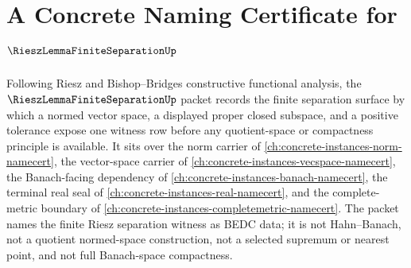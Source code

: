 \chapter{A Concrete Naming Certificate for $\RieszLemmaFiniteSeparationUp$}
\label{ch:concrete-instances-riesz-lemma-finite-separation-namecert}

Following Riesz and Bishop--Bridges constructive functional analysis, the $\RieszLemmaFiniteSeparationUp$ packet records the finite separation surface by which a normed vector space, a displayed proper closed subspace, and a positive tolerance expose one witness row before any quotient-space or compactness principle is available. It sits over the norm carrier of \autoref{ch:concrete-instances-norm-namecert}, the vector-space carrier of \autoref{ch:concrete-instances-vecspace-namecert}, the Banach-facing dependency of \autoref{ch:concrete-instances-banach-namecert}, the terminal real seal of \autoref{ch:concrete-instances-real-namecert}, and the complete-metric boundary of \autoref{ch:concrete-instances-completemetric-namecert}. The packet names the finite Riesz separation witness as BEDC data; it is not Hahn--Banach, not a quotient normed-space construction, not a selected supremum or nearest point, and not full Banach-space compactness.

